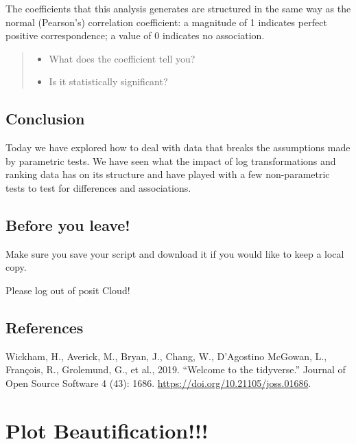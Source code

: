 \documentclass[
]{book}
\providecommand{\tightlist}{%
  \setlength{\itemsep}{0pt}\setlength{\parskip}{0pt}}
\begin{document}
The coefficients that this analysis generates are structured in the same way as the normal (Pearson's) correlation coefficient: a magnitude of 1 indicates perfect positive correspondence; a value of 0 indicates no association.

\begin{quote}
\begin{itemize}
\tightlist
\item
  What does the coefficient tell you?
\item
  Is it statistically significant?
\end{itemize}
\end{quote}

\hypertarget{conclusion-4}{%
\section{Conclusion}\label{conclusion-4}}

Today we have explored how to deal with data that breaks the assumptions made by parametric tests. We have seen what the impact of log transformations and ranking data has on its structure and have played with a few non-parametric tests to test for differences and associations.

\hypertarget{before-you-leave-6}{%
\section{Before you leave!}\label{before-you-leave-6}}

Make sure you save your script and download it if you would like to keep a local copy.

Please log out of posit Cloud!

\hypertarget{references-5}{%
\section{References}\label{references-5}}

Wickham, H., Averick, M., Bryan, J., Chang, W., D'Agostino McGowan, L., François, R., Grolemund, G., et al., 2019. ``Welcome to the tidyverse.'' Journal of Open Source Software 4 (43): 1686. \url{https://doi.org/10.21105/joss.01686}.

\hypertarget{plot-beautification}{%
\chapter{Plot Beautification!!!}\label{plot-beautification}}
\end{document}
